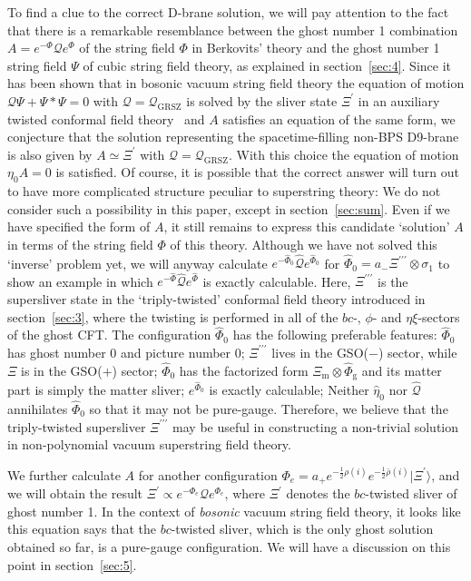 \documentclass[a4paper,12pt]{article}
\newcommand{\cQ}{\mathcal{Q}}
\newcommand{\Qmid}{\cQ_{\mathrm{GRSZ}}}
\newcommand{\tp}{\prime\prime\prime}
\begin{document}
To find a clue to the correct D-brane solution, we will pay attention to the fact that there is a 
remarkable resemblance between the ghost number 1 combination $A=e^{-\Phi}\cQ e^{\Phi}$ of the 
string field $\Phi$ in Berkovits' theory and the ghost number 1 string field $\Psi$ of cubic 
string field theory, as explained in section~\ref{sec:4}. Since it has been shown that in bosonic 
vacuum string field theory the equation of motion $\cQ\Psi+\Psi *\Psi=0$ with $\cQ=\Qmid$ is 
solved by the sliver state $\Xi^{\prime}$ in an auxiliary twisted conformal field 
theory~\cite{GRSZ1,HK,Okuyama2,Okuda} and $A$ satisfies an equation of the same form, we 
conjecture that the solution representing the spacetime-filling non-BPS D9-brane is also given by 
$A\simeq\Xi^{\prime}$ with $\cQ=\Qmid$. With this choice the equation of motion $\eta_0A=0$ is satisfied. 
Of course, it is possible that the correct answer will turn 
out to have more complicated structure peculiar to superstring theory: We do not consider such a 
possibility in this paper, except in section~\ref{sec:sum}. Even if we have specified the form of $A$, 
it still remains to express this 
candidate `solution' $A$ in terms of the string field $\Phi$ of this theory. 
Although we have not solved this `inverse' problem yet, we will anyway calculate $e^{-\widehat{\Phi}_0}
\widehat{\cQ}e^{\widehat{\Phi}_0}$ for $\widehat{\Phi}_0=a_-
\Xi^{\tp}\otimes\sigma_1$ to show an example in which $e^{-\widehat{\Phi}}\widehat{\cQ}e^{\widehat{\Phi}}$ 
is exactly calculable. Here, $\Xi^{\tp}$ is the supersliver state in the 
`triply-twisted' conformal field theory introduced in section~\ref{sec:3}, where the twisting 
is performed in all of the $bc$-, $\phi$- and $\eta\xi$-sectors of the ghost CFT. 
The configuration $\widehat{\Phi}_0$ has the following preferable features: $\widehat{\Phi}_0$ 
has ghost number 0 and picture number 0; $\Xi^{\tp}$ lives in the GSO($-$) sector, while $\Xi$ 
is in the GSO($+$) sector; $\widehat{\Phi}_0$ has the factorized form $\Xi_{\mathrm{m}}\otimes
\widehat{\Phi}_{\mathrm{g}}$ and its matter part is simply the matter sliver; $e^{\widehat{\Phi}_0}$ 
is exactly calculable; Neither $\widehat{\eta}_0$ nor $\widehat{\cQ}$ annihilates $\widehat{\Phi}_0$ 
so that it may not be pure-gauge. Therefore, we believe that the triply-twisted supersliver $\Xi^{\tp}$ 
may be useful in constructing a non-trivial solution in non-polynomial vacuum superstring field theory. 

We further calculate $A$ for another configuration $\Phi_e=a_+e^{-\frac{1}{2}
\rho(i)}e^{-\frac{1}{2}\bar{\rho}(i)}|\Xi^{\prime}\rangle$, 
and we will obtain the result $\Xi^{\prime}\propto
e^{-\Phi_e}\cQ e^{\Phi_e}$, where $\Xi^{\prime}$ denotes the $bc$-twisted sliver of ghost number 1. 
In the context of \textit{bosonic} vacuum string field theory, it looks like this equation says that 
the $bc$-twisted sliver, which is the only ghost solution obtained so far, is a pure-gauge 
configuration. We will have a discussion on this point in section~\ref{sec:5}. 
\end{document}
